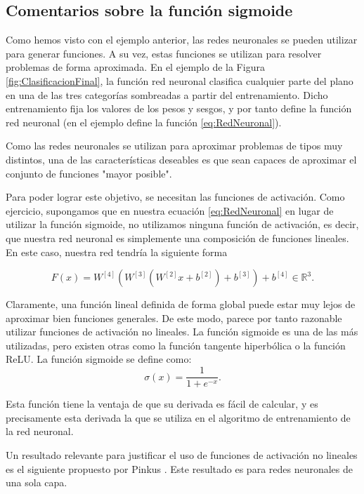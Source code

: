 \documentclass[a4paper,11pt,spanish, twoside, leqno]{tfg-uam}
\theoremstyle{definition}
\begin{document}
\subsection{Comentarios sobre la función sigmoide}\label{subsec:Sigmoide}
Como hemos visto con el ejemplo anterior, las redes neuronales se pueden utilizar para generar funciones. A su vez, estas funciones se utilizan para resolver problemas de forma aproximada. En el ejemplo de la Figura \ref{fig:ClasificacionFinal}, la función red neuronal clasifica cualquier parte del plano en una de las tres categorías sombreadas a partir del entrenamiento. Dicho entrenamiento fija los valores de los pesos y sesgos, y por tanto define la función red neuronal (en el ejemplo define la función \eqref{eq:RedNeuronal}).

Como las redes neuronales se utilizan para aproximar problemas de tipos muy distintos, una de las características deseables es que sean  capaces de aproximar el conjunto de funciones "mayor posible".

Para poder lograr este objetivo, se necesitan las funciones de activación. Como ejercicio, supongamos que en nuestra ecuación \eqref{eq:RedNeuronal} en lugar de utilizar la función sigmoide, no utilizamos ninguna función de activación, es decir, que nuestra red neuronal es simplemente una composición de funciones lineales. En este caso, nuestra red tendría la siguiente forma

\begin{equation*}
    F(x)=W^{[4]}(W^{[3]}(W^{[2]}x+b^{[2]})+b^{[3]})+b^{[4]}\in\mathbb{R}^3.
\end{equation*}

Claramente, una función lineal definida de forma global puede estar muy lejos de aproximar bien funciones generales. De este modo, parece por tanto razonable utilizar funciones de activación no lineales. La función sigmoide es una de las más utilizadas, pero existen otras como la función tangente hiperbólica o la función ReLU. La función sigmoide se define como:
\begin{equation*}
    \sigma(x)=\frac{1}{1+e^{-x}}.
\end{equation*}

Esta función tiene la ventaja de que su derivada es fácil de calcular, y es precisamente esta derivada la que se utiliza en el algoritmo de entrenamiento de la red neuronal.

Un resultado relevante para justificar el uso de funciones de activación no lineales es el siguiente propuesto por Pinkus \cite[Theorem 3.1]{pinkus1999approximation}. Este resultado es para redes neuronales de una sola capa.
\end{document}
